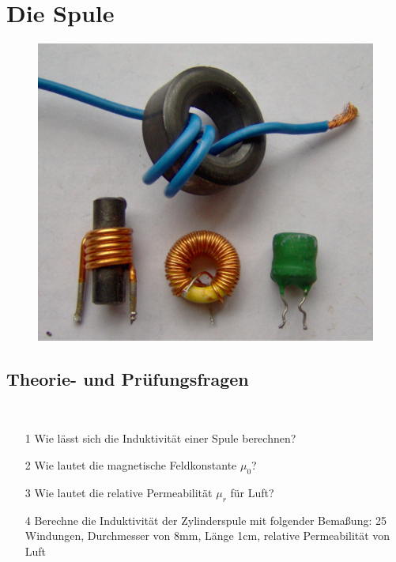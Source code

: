 \chapter{Die Spule}


\begin{figure}
 \vspace{-5cm}
 \includegraphics[scale=0.1]{Spule/Bilder/Electronic_component_inductors.jpg}
 \vspace{-5cm}
\end{figure}

\section*{Theorie- und Prüfungsfragen} 
~~~
\begin{enumerate}
\itemsep1pt\parskip0pt
\item[1] Wie lässt sich die Induktivität einer Spule berechnen?
\item[2] Wie lautet die magnetische Feldkonstante $\mu_0$?
\item[3] Wie lautet die relative Permeabilität $\mu_r$ für Luft?
\item[4] Berechne die Induktivität der Zylinderspule mit folgender Bemaßung: 25 Windungen, 	Durchmesser von 8mm, Länge 1cm, relative Permeabilität von Luft
\end{enumerate}

